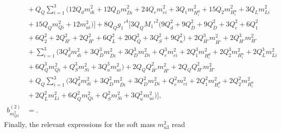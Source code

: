 \documentclass[preprint,amsmath,amssymb,aps,superscriptaddress,prd,showpacs,floatfix,nofootinbib]{revtex4-1}
\begin{document}
\begin{subequations}
\begin{align}
&{}+Q_Q\sum_{i=1}^3\big ( 12Q_dm_{di}^2+12Q_{\overline{D}}m_{\overline{D}i}^2+24Q_em_{ei}^2+3Q_1m_{H_i^d}^2+15Q_2m_{H_i^u}^2+3Q_Lm_{Li}^2\nonumber\\
&{}+15Q_Qm_{Qi}^2+12m_{ui}^2\big )\bigg ]+8Q_Qg_1'^4\bigg [ 3Q_QM_1'^2\big ( 9Q_d^2+9Q_{\overline{D}}^2+9Q_D^2+3Q_e^2+6Q_1^2\nonumber\\
&{}+6Q_2^2+2Q_{\overline{H'}}^2+2Q_{H'}^2+6Q_L^2+20Q_Q^2+3Q_S^2+9Q_u^2\big )+2Q_{\overline{H'}}^3m_{\overline{H'}}^2+2Q_{H'}^3m_{H'}^2\nonumber\\
&{}+\sum_{i=1}^3\big ( 3Q_d^3m_{di}^2+3Q_{\overline{D}}^3m_{\overline{D}i}^2+3Q_D^3m_{Di}^2+Q_e^3m_{ei}^2+2Q_1^3m_{H_i^d}^2+2Q_2^3m_{H_i^u}^2+2Q_L^3m_{Li}^2\nonumber\\
&{}+6Q_Q^3m_{Qi}^2+Q_S^3m_{Si}^2+3Q_u^3m_{ui}^2\big )+2Q_QQ_{\overline{H'}}^2m_{\overline{H'}}^2+2Q_QQ_{H'}^2m_{H'}^2\nonumber\\
&{}+Q_Q\sum_{i=1}^3\big ( 3Q_d^2m_{di}^2+3Q_{\overline{D}}^2m_{\overline{D}i}^2+3Q_D^2m_{Di}^2+Q_e^2m_{ei}^2+2Q_1^2m_{H_i^d}^2+2Q_2^2m_{H_i^u}^2\nonumber\\
&{}+2Q_L^2m_{Li}^2+6Q_Q^2m_{Qi}^2+Q_S^2m_{Si}^2+3Q_u^2m_{ui}^2\big )\bigg ],\label{eq:USSMmq222BetaTwoLoop}\\
b_{m_{Q3}^2}^{(2)}&=.\label{eq:USSMmq222Ot2Coeff}
\end{align}
\end{subequations}
Finally, the relevant expressions for the soft mass $m_{u3}^2$ read
\end{document}
